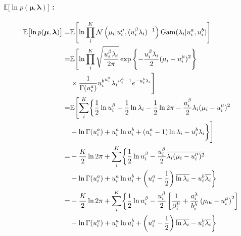 \paragraph{$\mathbb{E}\bigl[\ln p({\boldsymbol \mu}, {\boldsymbol \lambda}) \bigr]$ : }
\begin{align}
  \mathbb{E}\bigl[\ln p({\boldsymbol \mu}, {\boldsymbol \lambda}) \bigr]  =&  \mathbb{E}\Biggl[ \ln \prod_i^K  \mathcal{N}\left(\mu_i | u_i^\mu, (u_i^\beta \lambda_i)^{-1}\right) {\rm Gam}(\lambda_i | u_i^a, u_i^b)  \Biggr]  \\
%
    =&  \mathbb{E}\Biggl[ \ln \prod_i^K \sqrt{\frac{u_i^\beta \lambda_i}{2\pi}} \exp\left\{-\frac{u_i^\beta \lambda_i}{2} (\mu_i - u_i^\mu)^2 \right\}  \notag  \\  
      &  \times \frac{1}{\Gamma(u_i^a)} {u_i^b}^{u_i^a} {\lambda_i}^{u_i^a - 1} e^{- u_i^b \lambda_i} \Biggr]  \\
%
  =&  \mathbb{E}\Biggl[ \sum_i^K \biggl\{  
      \frac{1}{2} \ln u_i^\beta + \frac{1}{2} \ln \lambda_i - \frac{1}{2} \ln 2 \pi  - \frac{u_i^\beta}{2} \lambda_i (\mu_i - u_i^\mu)^2  \notag  \\
      &  - \ln \Gamma(u_i^a) + u_i^a \ln u_i^b + \left(u_i^a - 1\right) \ln \lambda_i - u_i^b \lambda_i  
    \biggr\} \Biggr]  \\
%
  =&   - \frac{K}{2} \ln 2 \pi + \sum_i^K \biggl\{  
      \frac{1}{2} \ln u_i^\beta - \frac{u_i^\beta}{2} \overline{\lambda_i (\mu_i - u_i^\mu)^2}  \notag  \\
      &  - \ln \Gamma(u_i^a) + u_i^a \ln u_i^b + \left(u_i^a - \frac{1}{2}\right) \overline{\ln \lambda_i} - u_i^b \overline{\lambda_i}  
    \biggr\}  \\ 
%
  =&   - \frac{K}{2} \ln 2 \pi + \sum_i^K \biggl\{  
      \frac{1}{2} \ln u_i^\beta - \frac{u_i^\beta}{2} \left[ \frac{1}{\beta_i^\mu} + \frac{a_i^\lambda}{b_i^\lambda} \left( \mu_{0i} - u_i^\mu \right)^2 \right]  \notag  \\
      &  - \ln \Gamma(u_i^a) + u_i^a \ln u_i^b + \left(u_i^a - \frac{1}{2}\right) \overline{\ln \lambda_i} - u_i^b \overline{\lambda_i}  
    \biggr\}  
\end{align}

